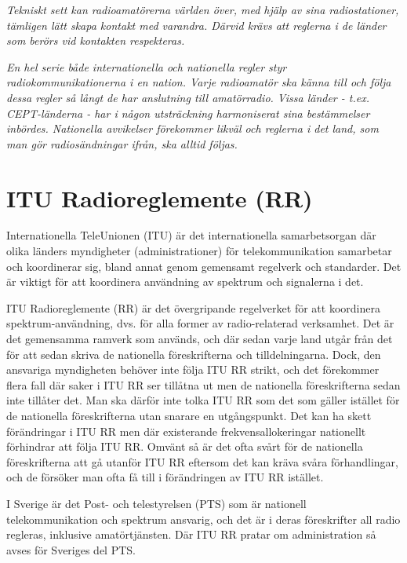 \emph{Tekniskt sett kan radioamatörerna världen över, med hjälp av
  sina radiostationer, tämligen lätt skapa kontakt med
  varandra. Därvid krävs att reglerna i de länder som berörs vid
  kontakten respekteras.}

\emph{En hel serie både internationella och nationella regler styr
  radiokommunikationerna i en nation. Varje radioamatör ska känna
  till och följa dessa regler så långt de har anslutning till
  amatörradio. Vissa länder - t.ex. CEPT-länderna - har i någon
  utsträckning harmoniserat sina bestämmelser inbördes.  Nationella
  avvikelser förekommer likväl och reglerna i det land, som man gör
  radiosändningar ifrån, ska alltid följas.}

\section{ITU Radioreglemente (RR)}

Internationella TeleUnionen (ITU) är det internationella samarbetsorgan där
olika länders myndigheter (administrationer) för telekommunikation samarbetar
och koordinerar sig, bland annat genom gemensamt regelverk och standarder.
Det är viktigt för att koordinera användning av spektrum och signalerna i det.

ITU Radioreglemente (RR) \cite{ITU-RR} är det övergripande regelverket för att
koordinera spektrum-användning, dvs. för alla former av radio-relaterad
verksamhet. Det är det gemensamma ramverk som används, och där sedan varje land
utgår från det för att sedan skriva de nationella föreskrifterna och
tilldelningarna. Dock, den ansvariga myndigheten behöver inte följa ITU RR
strikt, och det förekommer flera fall där saker i ITU RR ser tillåtna ut men
de nationella föreskrifterna sedan inte tillåter det. Man ska därför inte
tolka ITU RR som det som gäller istället för de nationella föreskrifterna utan
snarare en utgångspunkt. Det kan ha skett förändringar i ITU RR men där
existerande frekvensallokeringar nationellt förhindrar att följa ITU RR.
Omvänt så är det ofta svårt för de nationella föreskrifterna att gå utanför
ITU RR eftersom det kan kräva svåra förhandlingar, och de försöker man ofta
få till i förändringen av ITU RR istället.

I Sverige är det Post- och telestyrelsen (PTS) som är nationell telekommunikation
och spektrum ansvarig, och det är i deras föreskrifter all radio regleras,
inklusive amatörtjänsten. Där ITU RR pratar om administration så avses för
Sveriges del PTS.

